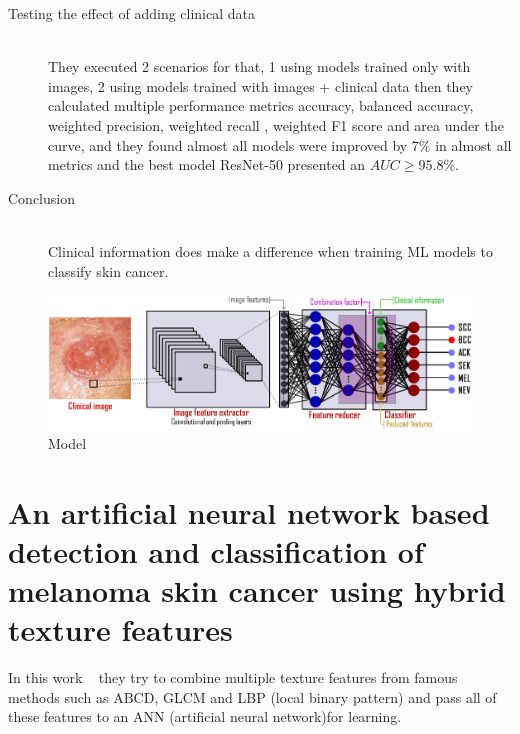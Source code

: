 \begin{description}
\item[Testing the effect of adding clinical data] \hfill \\
    They executed 2 scenarios for that, 1 using models trained only with images, 2 using models trained with images + clinical data then they calculated multiple  performance metrics accuracy, balanced accuracy, weighted precision, weighted recall , weighted F1 score  and area under the curve, and they found almost all models were improved by 7\% in almost all metrics and the best model ResNet-50 presented an $AUC \geq 95.8\%$.

\item[Conclusion] \hfill \\
    Clinical information does make a difference when training ML models to classify skin cancer.
\end{description}



\begin{figure}[htbp]
\begin{center}
\includegraphics[width=15cm]{./chapter-03-state-of-the-art/clinical-image.png}
\end{center}
\caption{Model}
\label{fig:model}
\end{figure}








\section{An artificial neural network based detection and classification of melanoma skin cancer using hybrid texture features}

    In this work ~\cite{Tumpa2021} they try to combine multiple texture features from famous methods such as  ABCD, GLCM and LBP (local binary pattern) and pass all of these features to an ANN (artificial neural network)for learning.

